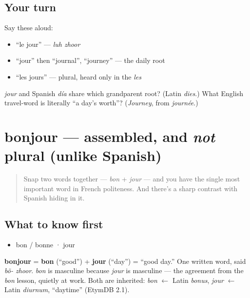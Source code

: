 \subsection*{Your turn}
Say these aloud:

\begin{itemize}
\raggedright
  \item \textquotedblleft{}le jour\textquotedblright{} — \emph{luh zhoor}
  \item \textquotedblleft{}jour\textquotedblright{} then \textquotedblleft{}journal\textquotedblright{}, \textquotedblleft{}journey\textquotedblright{} — the daily root
  \item \textquotedblleft{}les jours\textquotedblright{} — plural, heard only in the \emph{les}
\end{itemize}

\begin{tcolorbox}[breakable,colback=teal!4,colframe=teal!35!black,title={Before you move on}]
\emph{jour} and Spanish \emph{día} share which grandparent root? (Latin \emph{dies}.) What English travel-word is literally \textquotedblleft{}a day's worth\textquotedblright{}? (\emph{Journey}, from \emph{journée}.)
\end{tcolorbox}
\section[bonjour]{bonjour — assembled, and \emph{not} plural (unlike Spanish)}

\label{lesson:FR-C01-bonjour}



\begin{quote}
Snap two words together — \emph{bon} + \emph{jour} — and you have the single most important word in French politeness. And there's a sharp contrast with Spanish hiding in it.
\end{quote}

\subsection*{What to know first}
\begin{itemize}
\raggedright
  \item bon / bonne · jour
\end{itemize}

\begin{cousinweb}
\textbf{bonjour} = \textbf{bon} (\textquotedblleft{}good\textquotedblright{}) + \textbf{jour} (\textquotedblleft{}day\textquotedblright{}) = \textquotedblleft{}good day.\textquotedblright{} One written word, said \emph{bõ- zhoor}. \emph{bon} is masculine because \emph{jour} is masculine — the agreement from the \emph{bon} lesson, quietly at work. Both are inherited: \emph{bon} $\leftarrow$ Latin \emph{bonus}, \emph{jour} $\leftarrow$ Latin \emph{diurnum}, \textquotedblleft{}daytime\textquotedblright{} (EtymDB 2.1).
\end{cousinweb}

